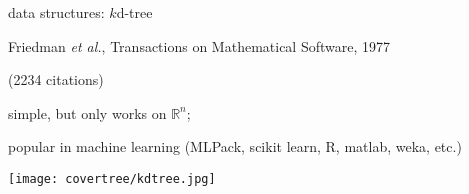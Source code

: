 \begin{frame}[fragile]{data structures: $k$d-tree}

Friedman \emph{et al.}, Transactions on Mathematical Software, 1977

(2234 citations)

\vspace{0.25cm}
simple, but only works on $\mathbb{R}^n$;

\vspace{0.25cm}
popular in machine learning (MLPack, scikit learn, R, matlab, weka, etc.)

\vspace{0.25cm}

\texttt{[image: covertree/kdtree.jpg]}
\end{frame}

